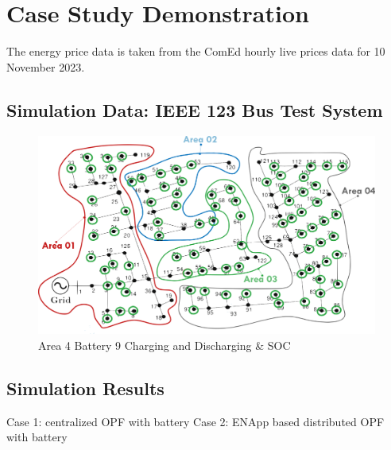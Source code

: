 \documentclass{article}
\begin{document}
\section{Case Study Demonstration}
The energy price data is taken from the ComEd hourly live prices data \cite{comedLivePrices} for 10 November 2023. 
\subsection{Simulation Data: IEEE 123 Bus Test System}

\begin{figure}[h!]
    \centering
    \includegraphics[width=\linewidth]{../figures/ieee123-FourAreas.png}
    \caption{Area 4 Battery 9 Charging and Discharging \& SOC}
    \label{fig:battery_charging_discharging}
\end{figure}

\subsection{Simulation Results}
Case 1: centralized OPF with battery
Case 2: ENApp based distributed OPF with battery
\end{document}
